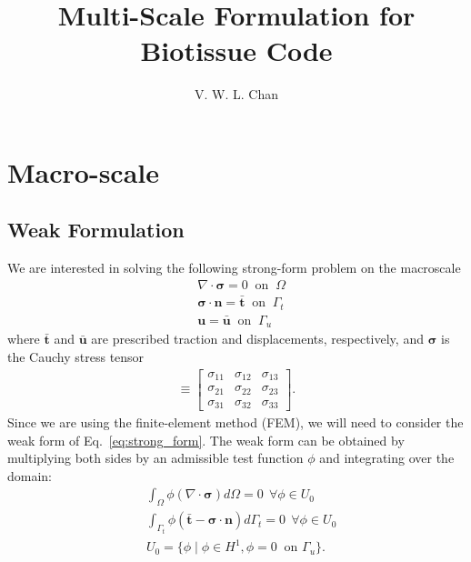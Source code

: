 \documentclass[12pt,aps,pre]{revtex4}
\begin{document}
\title{Multi-Scale Formulation for Biotissue Code}
\author{V. W. L. Chan}
\maketitle

\section{Macro-scale}

\subsection{Weak Formulation}
We are interested in solving the following strong-form problem on the macroscale
%
\begin{align}
&\nabla \cdot \pmb{\sigma} = 0 \ \text{ on } \ \Omega \nonumber\\
&\pmb{\sigma} \cdot \pmb{n} = \bar{\pmb{t}} \ \text{ on } \ \Gamma_t \nonumber\\
&\pmb{u} = \bar{\pmb{u}} \ \text{ on } \ \Gamma_u 
\label{eq:strong_form}
\end{align}
%
where $\bar{\pmb{t}}$ and $\bar{\pmb{u}}$ are prescribed traction and displacements, respectively, and $\pmb{\sigma}$ is the Cauchy stress tensor
%
\begin{eqnarray}
[\pmb{\sigma}] \equiv
\begin{bmatrix}
\sigma_{11} & \sigma_{12} & \sigma_{13} \\
\sigma_{21} & \sigma_{22} & \sigma_{23} \\
\sigma_{31} & \sigma_{32} & \sigma_{33} 
\end{bmatrix} .
\label{eq:Cauchy_stress_tensor}
\end{eqnarray}
%
Since we are using the finite-element method (FEM), we will need to consider the weak form of Eq.\ \eqref{eq:strong_form}. The weak form can be obtained by multiplying both sides by an admissible test function $\phi$ and integrating over the domain:
%
\begin{align}
&\int_{\Omega} \phi (\nabla \cdot \pmb{\sigma})d\Omega  = 0 \ \ \forall \phi \in U_0 \nonumber\\
&\int_{\Gamma_t}\phi (\bar{\pmb{t}}-\pmb{\sigma} \cdot \pmb{n})d\Gamma_t = 0 \ \ \forall \phi \in U_0 \nonumber\\
&U_0 = \{\phi \mid \phi \in H^1, \phi = 0 \ \text{ on } \Gamma_u \} .
\label{eq:weak_form1}
\end{align}
%
\end{document}
